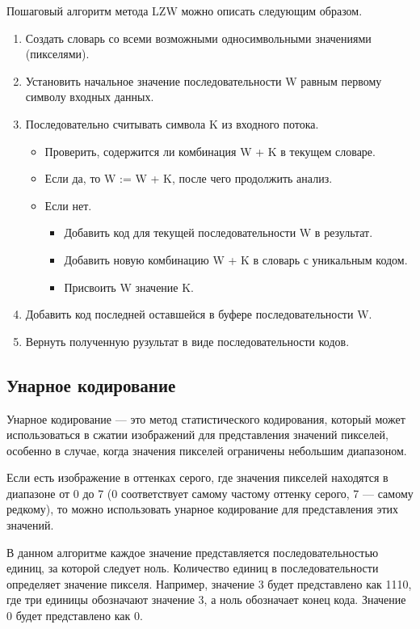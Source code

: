 Пошаговый алгоритм метода LZW можно описать следующим образом.
\begin{enumerate}
    \item Создать словарь со всеми возможными односимвольными значениями (пикселями).
    \item Установить начальное значение последовательности W равным первому символу входных данных.
    \item Последовательно считывать символа K из входного потока.
    \begin{itemize}
        \item Проверить, содержится ли комбинация W + K в текущем словаре.
        \item Если да, то W := W + K, после чего продолжить анализ.
        \item Если нет.
        \begin{itemize}
            \item Добавить код для текущей последовательности W в результат.
            \item Добавить новую комбинацию W + K в словарь с уникальным кодом.
            \item Присвоить W значение K.
        \end{itemize}
    \end{itemize}
    \item Добавить код последней оставшейся в буфере последовательности W.
    \item Вернуть полученную рузультат в виде последовательности кодов.
\end{enumerate}

\subsection{Унарное кодирование}

Унарное кодирование --- это метод статистического кодирования, который может использоваться в сжатии изображений для представления значений пикселей, особенно в случае, когда значения пикселей ограничены небольшим диапазоном. 

Если есть изображение в оттенках серого, где значения пикселей находятся в диапазоне от 0 до 7 (0 соответствует самому частому оттенку серого, 7 --- самому редкому), то можно использовать унарное кодирование для представления этих значений.

В данном алгоритме каждое значение представляется последовательностью единиц, за которой следует ноль. Количество единиц в последовательности определяет значение пикселя. Например, значение 3 будет представлено как 1110, где три единицы обозначают значение 3, а ноль обозначает конец кода. Значение 0 будет представлено как 0.

